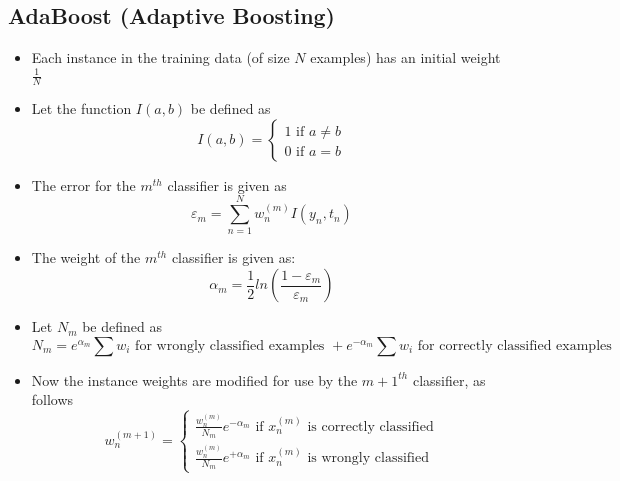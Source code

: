 \documentclass{article}
\theoremstyle{plain}
\theoremstyle{definition}
\begin{document}
\subsection{AdaBoost (Adaptive Boosting)}
\begin{itemize}
    \item Each instance in the training data (of size $N$ examples) has an initial weight $\frac{1}{N}$
    
    \item Let the function $I(a, b)$ be defined as
    \begin{equation*}
        I(a, b) = \begin{cases}
            1 \text{ if } a \ne b\\
            0 \text{ if } a=b
        \end{cases}
    \end{equation*}
    
    \item The error for the $m^{th}$ classifier is given as
    \begin{equation}
        \varepsilon_m = \sum\limits_{n=1}^{N} w_n^{(m)} I(y_n, t_n)
    \end{equation}
    
    \item The weight of the $m^{th}$ classifier is given as:
    \begin{equation}
        \alpha_m = \frac{1}{2}ln \left (\frac{1 - \varepsilon_m }{\varepsilon_m} \right )
    \end{equation}
    
    \item Let $N_m$ be defined as
    \begin{equation*}
        N_m = e^{\alpha_m}\sum w_i \text{ for wrongly classified examples } +  e^{-\alpha_m}\sum w_i\text{ for correctly classified examples}
    \end{equation*}
    
    \item Now the instance weights are modified for use by the $m+1^{th}$ classifier, as follows
    \begin{equation}
        w_n^{(m+1)} = \begin{cases}
            \frac{w_n^{(m)}}{N_m} e^{-\alpha_m} \text{ if }x_n^{(m)}\text{ is correctly classified}\\
            \frac{w_n^{(m)}}{N_m} e^{+\alpha_m} \text{ if }x_n^{(m)}\text{ is wrongly classified}
        \end{cases}
    \end{equation}
    

\end{itemize}
\end{document}
